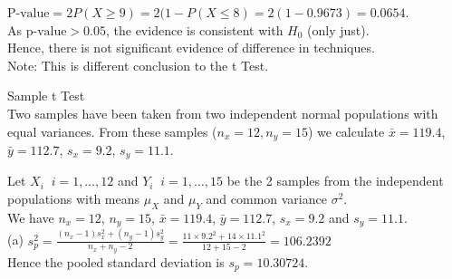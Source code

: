 \documentclass[bigtut]{tutorial}\usepackage[]{graphicx}\usepackage[]{color}
\begin{document}
\begin{tutorial}
\begin{questions}
\begin{solution}
$\text{P-value} = 2 P(X \geq 9) = 2(1- P(X \leq 8) 
= 2(1- 0.9673) = 0.0654$. \\

 As $\text{p-value} > 0.05$, the evidence is consistent with $H_{0}$ (only just). \\
Hence, there is not significant evidence of difference in techniques. \\
Note: This is different conclusion to the t Test. \\

\end{solution}



 Sample t Test  \\

Two samples have been taken from two independent normal populations with equal variances. 
From these samples ($n_x = 12, n_y = 15$) we calculate $\bar x=119.4$, $\bar
y=112.7$, $s_x=9.2$, $s_y=11.1$.  \\



\begin{solution}
Let $X_{i} \;\; i=1,\ldots,12$ and 
$Y_{i} \;\; i=1,\ldots,15$
be the 2 samples from the independent populations with means $\mu_{X}$ and $\mu_{Y}$ and common variance $\sigma^2$. \\

We have $n_x = 12$, $n_y = 15$, $\bar x=119.4$, $\bar y=112.7$, $s_x=9.2$ and $s_y=11.1$. \\


(a)
$s_p^2 =  \frac{   (n_x-1) s_x^2 + (n_y-1) s_y^2 }{ n_x + n_y -2 } = 
\frac{   11 \times 9.2^2 + 14 \times 11.1^2 }{ 12+15-2 } = 106.2392$ \\

Hence the pooled standard deviation is $s_{p} = 10.30724$. \\




\end{solution}
\end{questions}
\end{tutorial}
\end{document}
